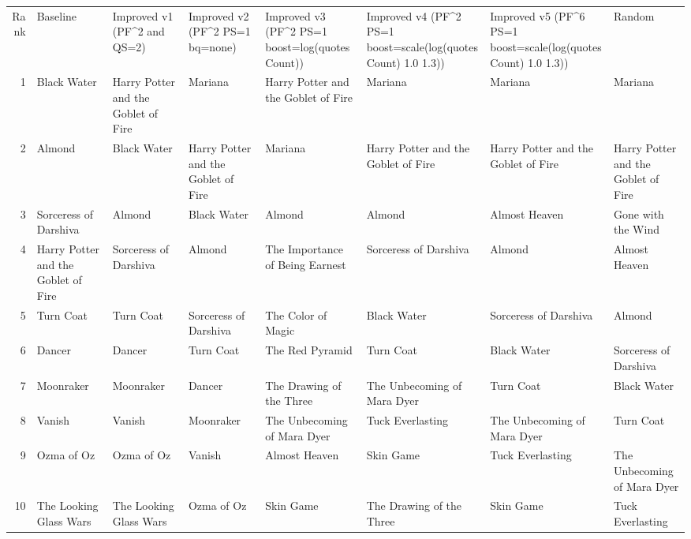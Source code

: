 \begin{tabular}{rlllllll}
Rank & Baseline & Improved v1 (PF^2 and QS=2) & Improved v2 (PF^2 PS=1 bq=none) & Improved v3 (PF^2 PS=1 boost=log(quotesCount)) & Improved v4 (PF^2 PS=1 boost=scale(log(quotesCount) 1.0 1.3)) & Improved v5 (PF^6 PS=1 boost=scale(log(quotesCount) 1.0 1.3)) & Random \\
1 & Black Water & Harry Potter and the Goblet of Fire & Mariana & Harry Potter and the Goblet of Fire & Mariana & Mariana & Mariana \\
2 & Almond & Black Water & Harry Potter and the Goblet of Fire & Mariana & Harry Potter and the Goblet of Fire & Harry Potter and the Goblet of Fire & Harry Potter and the Goblet of Fire \\
3 & Sorceress of Darshiva & Almond & Black Water & Almond & Almond & Almost Heaven & Gone with the Wind \\
4 & Harry Potter and the Goblet of Fire & Sorceress of Darshiva & Almond & The Importance of Being Earnest & Sorceress of Darshiva & Almond & Almost Heaven \\
5 & Turn Coat & Turn Coat & Sorceress of Darshiva & The Color of Magic & Black Water & Sorceress of Darshiva & Almond \\
6 & Dancer & Dancer & Turn Coat & The Red Pyramid & Turn Coat & Black Water & Sorceress of Darshiva \\
7 & Moonraker & Moonraker & Dancer & The Drawing of the Three & The Unbecoming of Mara Dyer & Turn Coat & Black Water \\
8 & Vanish & Vanish & Moonraker & The Unbecoming of Mara Dyer & Tuck Everlasting & The Unbecoming of Mara Dyer & Turn Coat \\
9 & Ozma of Oz & Ozma of Oz & Vanish & Almost Heaven & Skin Game & Tuck Everlasting & The Unbecoming of Mara Dyer \\
10 & The Looking Glass Wars & The Looking Glass Wars & Ozma of Oz & Skin Game & The Drawing of the Three & Skin Game & Tuck Everlasting \\
\end{tabular}
